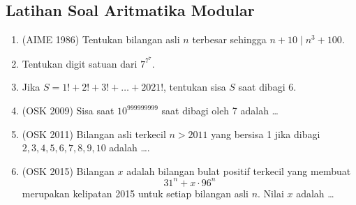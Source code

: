 \subsection{Latihan Soal Aritmatika Modular}
\begin{enumerate}    
    \item (AIME 1986) Tentukan bilangan asli $n$ terbesar sehingga $n+10 \mid n^3+100$.
    
    \item Tentukan digit satuan dari $7^{7^7}$.
    
    \item Jika $S=1!+2!+3!+\dots+2021!$, tentukan sisa $S$ saat dibagi 6.
    
    \item (OSK 2009) Sisa saat $10^{999999999}$ saat dibagi oleh 7 adalah \dots
    
    \item (OSK 2011) Bilangan asli terkecil $n>2011$ yang bersisa 1 jika dibagi $2,3,4,5,6,7,8,9,10$ adalah \dots.

    \item (OSK 2015) Bilangan $x$ adalah bilangan bulat positif terkecil yang membuat
    \[31^n + x \cdot 96^n\]
    merupakan kelipatan 2015 untuk setiap bilangan asli $n$. Nilai $x$ adalah \ldots
\end{enumerate}